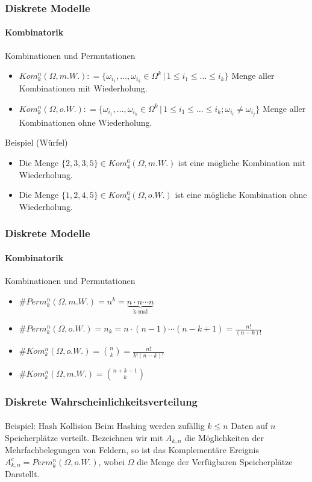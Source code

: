 \documentclass{beamer}
\begin{document}
\begin{frame}
    \frametitle{Diskrete Modelle}
\framesubtitle{Kombinatorik}

\begin{block}{Kombinationen und Permutationen}
\begin{itemize}
\item $Kom_k^n(\Omega, m.W.) : = \{ \omega_{i_1}, \ldots, \omega_{i_k} \in \Omega^k  \, | \, 1  \leq i_1 \leq  \ldots  \leq i_k \}$  Menge aller Kombinationen  mit Wiederholung.
\item $Kom_k^n(\Omega, o.W.) : = \{ \omega_{i_1}, \ldots, \omega_{i_k} \in \Omega^k  \, | \, 1 \leq i_1  \leq \ldots \leq i_k ;  \omega_{i_i} \neq \omega_{i_j} \}$  Menge aller Kombinationen  ohne  Wiederholung.
\end{itemize}
\end{block}
\begin{block}{Beispiel (Würfel)}
\begin{itemize}
\item Die Menge $\{2,3,3,5\} \in Kom_4^6(\Omega, m.W.)$ ist eine mögliche Kombination mit Wiederholung.
\item Die Menge $\{1,2,4,5\} \in Kom_4^6(\Omega, o.W.)$ ist eine mögliche Kombination ohne Wiederholung.
\end{itemize}
\end{block}
 \end{frame}



\begin{frame}
    \frametitle{Diskrete Modelle}
\framesubtitle{Kombinatorik}

\begin{block}{Kombinationen und Permutationen}
\begin{itemize}
\item $\# Perm_k^n(\Omega, m.W.)  = n^k = \underbrace{n \cdot n \cdots n}_{\text{k-mal}}$
\item $\# Perm_k^n(\Omega, o.W.)  = n_k = n \cdot (n-1) \cdots  (n-k+1) = \frac{n!}{(n-k)!}$  
\item $\#Kom_k^n(\Omega, o.W.) = \binom{n}{k} = \frac{n!}{k! (n-k)!}$  
\item $\#Kom_k^n(\Omega, m.W.)  = \binom{n + k -1}{k}$  
\end{itemize}
\end{block}
 \end{frame}


\begin{frame}
    \frametitle{Diskrete Wahrscheinlichkeitsverteilung}
\framesubtitle{}

\begin{block}{Beispiel: Hash Kollision}
Beim Hashing werden zufällig $k \leq n$ Daten auf $n$ Speicherplätze  verteilt. Bezeichnen wir mit $A_{k,n}$ die Möglichkeiten der Mehrfachbelegungen von Feldern, so ist das Komplementäre Ereignis
$A^c_{k,n} = Perm^n_k(\Omega, o.W.)$,  wobei $\Omega$ die Menge der Verfügbaren Speicherplätze Darstellt. 
\end{block}



 \end{frame}
\end{document}
